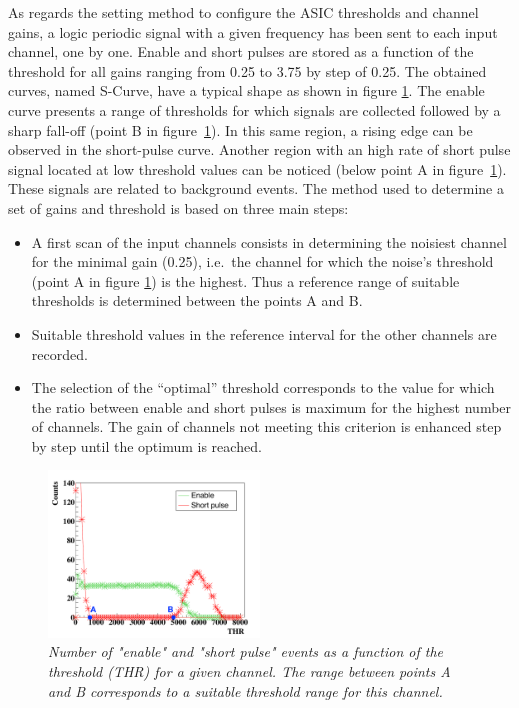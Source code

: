 \documentclass[a4paper,11pt]{article}
\begin{document}
As regards the setting method to configure the ASIC thresholds and channel gains, a logic periodic signal with a given frequency has been sent to each input channel, one by one. Enable and short pulses are stored as a function of the threshold for all gains ranging from 0.25 to 3.75 by step of 0.25. The obtained curves, named S-Curve, have a typical shape as shown in figure \ref{fig:S_Curve}. The enable curve presents a range of thresholds for which signals are collected followed by a sharp fall-off (point B in figure~\ref{fig:S_Curve}). In this same region, a rising edge can be observed in the short-pulse curve. Another region with an high rate of short pulse signal located at low threshold values can be noticed (below point A in figure~\ref{fig:S_Curve}). These signals are related to background events. The method used to determine a set of gains and threshold is based on three main steps:
\begin{itemize}
\item A first scan of the input channels consists in determining the noisiest channel for the minimal gain (0.25), i.e.~the channel for which the noise’s threshold (point A in figure \ref{fig:S_Curve}) is the highest. Thus a reference range of suitable thresholds is determined between the points A and B.
\item Suitable threshold values in the reference interval for the other channels are recorded.
\item The selection of the “optimal” threshold corresponds to the value for which the ratio between enable and short pulses is maximum for the highest number of channels. The gain of channels not meeting this criterion is enhanced step by step until the optimum is reached.
\end{itemize}

\begin{figure}[htb]
\centering
\includegraphics[width=0.5\textwidth]{figures/S_Curve_Thr_suitable_rangeAB.pdf}
\caption{\small{\textit{Number of "enable" and "short pulse" events as a function of the threshold (THR) for a given channel. The range between points A and B corresponds to a suitable threshold range for this channel.}}}
\label{fig:S_Curve}
\end{figure}
\end{document}
